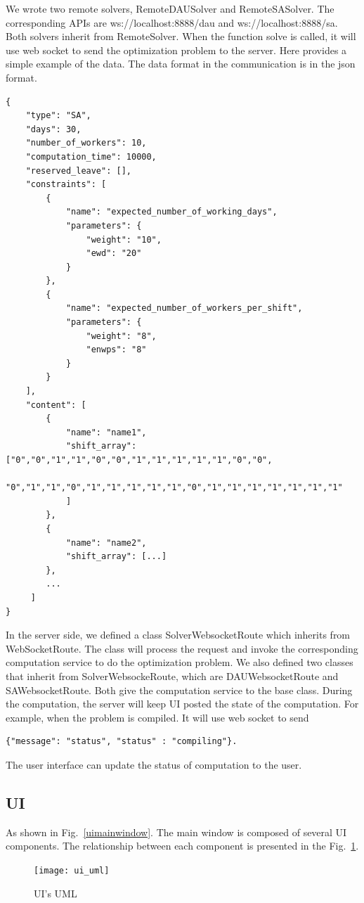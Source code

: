 \documentclass[11pt, oneside]{article}   	%
\begin{document}
We wrote two remote solvers, RemoteDAUSolver and RemoteSASolver. The corresponding APIs are ws://localhost:8888/dau and ws://localhost:8888/sa. Both solvers inherit from RemoteSolver.
When the function solve is called, it will use web socket to send the optimization problem to the server. Here provides a simple example of the data.
The data format in the communication is in the json format.
\begin{verbatim}
{
    "type": "SA",
    "days": 30,
    "number_of_workers": 10,
    "computation_time": 10000,
    "reserved_leave": [],
    "constraints": [
        {
            "name": "expected_number_of_working_days",
            "parameters": {
                "weight": "10",
                "ewd": "20"
            }
        },
        {
            "name": "expected_number_of_workers_per_shift",
            "parameters": {
                "weight": "8",
                "enwps": "8"
            }
        }
    ],
    "content": [
        {
            "name": "name1",
            "shift_array": ["0","0","1","1","0","0","1","1","1","1","1","0","0",
            "0","1","1","0","1","1","1","1","1","0","1","1","1","1","1","1","1"
            ]
        },
        {
            "name": "name2",
            "shift_array": [...]
        },
        ...
     ]
}

\end{verbatim}
In the server side, we defined a class SolverWebsocketRoute which inherits from WebSocketRoute. 
The class will process the request and invoke the corresponding computation service to do the optimization problem.
We also defined two classes that inherit from SolverWebsockeRoute, which are DAUWebsocketRoute and SAWebsocketRoute.
Both give the computation service to the base class.
During the computation, the server will keep UI posted the state of the computation. For example, when the problem is compiled. It will use web socket to send
\begin{verbatim}
{"message": "status", "status" : "compiling"}.
\end{verbatim}
The user interface can update the status of computation to the user.

\subsection{UI}
As shown in Fig.~\ref{uimainwindow}. The main window is composed of several UI components. The relationship between each component is presented in the Fig.~\ref{uiuml}.
\begin{figure}
\centering
\texttt{[image: ui\_uml]}
\caption{UI's UML}
\label{uiuml}
\end{figure}
\end{document}
